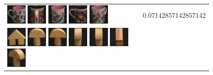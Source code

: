 \begin{figure}[tbp]
\begin{center}
\begin{tabular}{m{11cm} | m{3cm} |}
\includegraphics[width=1cm]{coil/beeld-7.eps}
\includegraphics[width=1cm]{coil/beeld-65.eps}
\includegraphics[width=1cm]{coil/beeld-8.eps}
\includegraphics[width=1cm]{coil/beeld-61.eps}
\includegraphics[width=1cm]{coil/beeld-9.eps}
& {\scriptsize 0.07142857142857142}
\\
\includegraphics[width=1cm]{coil/beeld-42.eps}
\includegraphics[width=1cm]{coil/beeld-0.eps}
\includegraphics[width=1cm]{coil/beeld-1.eps}
\includegraphics[width=1cm]{coil/beeld-5.eps}
\includegraphics[width=1cm]{coil/beeld-2.eps}
\includegraphics[width=1cm]{coil/beeld-44.eps}
\includegraphics[width=1cm]{coil/beeld-4.eps}

\end{tabular}
\end{center}
\end{figure}
